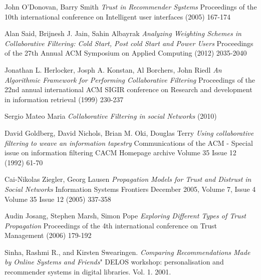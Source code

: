 \documentclass{VUMIFInfMagistrinis}
\begin{document}
\begin{thebibliography}{9}
John O'Donovan, Barry Smith
\textit{Trust in Recommender Systems}
Proceedings of the 10th international conference on Intelligent user interfaces (2005) 167-174
	
Alan Said, Brijnesh J. Jain, Sahin Albayrak
\textit{Analyzing Weighting Schemes in Collaborative Filtering: Cold Start, Post cold Start and Power Users}
Proceedings of the 27th Annual ACM Symposium on Applied Computing (2012) 2035-2040
	
Jonathan L. Herlocker, Josph A. Konstan, Al Borchers, John Riedl
\textit{An Algorithmic Framework for Performing Collaborative Filtering}
Proceedings of the 22nd annual international ACM SIGIR conference on Research and development in information retrieval (1999)  230-237
	
Sergio Mateo Maria
\textit{Collaborative Filtering in social Networks}
(2010) 
	
David Goldberg, David Nichols, Brian M. Oki, Douglas Terry
\textit{Using collaborative filtering to weave an information tapestry}
Communications of the ACM - Special issue on information filtering CACM Homepage archive
Volume 35 Issue 12 (1992)  61-70

Cai-Nikolas Ziegler, Georg Lausen
\textit{Propagation Models for Trust and Distrust in Social Networks}
Information Systems Frontiers December 2005, Volume 7, Issue 4
Volume 35 Issue 12 (2005)  337-358

Audin Josang, Stephen Marsh, Simon Pope
\textit{Exploring Different Types of Trust Propagation}
Proceedings of the 4th international conference on Trust Management (2006) 179-192 

Sinha, Rashmi R., and Kirsten Swearingen. 
\textit{Comparing Recommendations Made by Online Systems and Friends}"
DELOS workshop: personalisation and recommender systems in digital libraries. Vol. 1. 2001.
	
\end{thebibliography}
\end{document}
